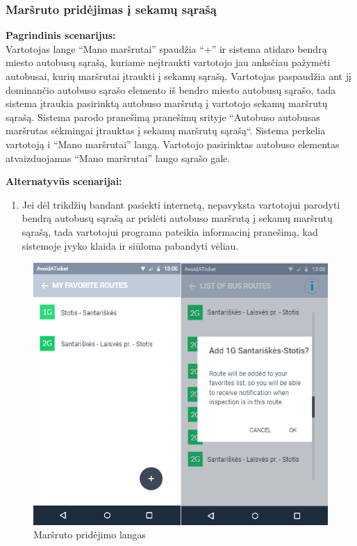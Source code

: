 \documentclass{VUMIFPSkursinis}
\begin{document}
\subsubsection{Maršruto pridėjimas į sekamų sąrašą}
	\textbf{Pagrindinis scenarijus:}\\
	Vartotojas lange “Mano maršrutai” spaudžia “+” ir sistema atidaro bendrą miesto autobusų sąrašą, kuriame neįtraukti 
	vartotojo jau anksčiau pažymėti autobusai, kurių maršrutai įtraukti į sekamų sąrašą. Vartotojas paspaudžia ant jį 
	dominančio autobuso sąrašo elemento iš bendro miesto autobusų sąrašo, tada sistema įtraukia pasirinktą autobuso maršrutą 
	į vartotojo sekamų maršrutų sąrašą. Sistema parodo pranešimą pranešimų srityje “Autobuso {autobusas} maršrutas sėkmingai 
	įtrauktas į sekamų maršrutų sąrašą“. Sistema perkelia vartotoją i “Mano maršrutai” langą. Vartotojo pasirinktas autobuso 
	elementas atvaizduojamas “Mano maršrutai” lango sąrašo gale.

	\textbf{Alternatyvūs scenarijai:}
	\begin{enumerate}
		\item Jei dėl trikdžių bandant pasiekti internetą, nepavyksta vartotojui parodyti bendrą autobusų sąrašą ar pridėti autobuso maršrutą į sekamų maršrutų sąrašą, tada vartotojui programa pateikia informacinį pranešimą, kad sistemoje įvyko klaida ir siūloma pabandyti vėliau.
	\end{enumerate} 
	\begin{figure}[H]
				\centering
				\includegraphics[scale=1.5]{img/mockup_AddRoute}
				\caption{Maršruto pridėjimo langas}
				\label{img:Maršruto pridėjimo langas}
			\end{figure}
\end{document}
